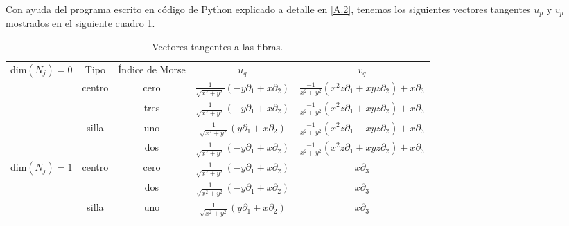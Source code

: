 \documentclass[a4paper,10pt]{book}
\begin{document}
Con ayuda del programa escrito en c\'odigo de Python explicado a detalle en \ref{A.2}, tenemos los siguientes vectores tangentes $u_{p}$ y $v_{p}$ mostrados en el siguiente cuadro \ref{tabla7}.\\

\begin{table}[!ht]
\centering
\begin{tabular}{|c|c|c|c|c|}
\hline
\multirow{5}{*}{dim$(N_{j})=0$} & Tipo                    & \multicolumn{1}{l|}{\'Indice de Morse } & $u_{q}$                                                                      & $v_{q}$                                                                                                      \\ \cline{2-5} 
                                & \multirow{2}{*}{centro} & cero                             & $\frac{1}{\sqrt{x^{2}+y^{2}}}(-y\partial_{1}+x\partial_{2})$ & $\frac{-1}{x^{2}+y^{2}}(x^{2}z\partial_{1}+xyz\partial_{2})+x\partial_{3}$ \\ \cline{3-5} 
                                &                         & tres                            & $\frac{1}{\sqrt{x^{2}+y^{2}}}(-y\partial_{1}+x\partial_{2})$ & $\frac{-1}{x^{2}+y^{2}}(x^{2}z\partial_{1}+xyz\partial_{2})+x\partial_{3}$ \\ \cline{2-5} 
                                & \multirow{2}{*}{silla} & uno                              & $\frac{1}{\sqrt{x^{2}+y^{2}}}(y\partial_{1}+x\partial_{2})$  & $\frac{-1}{x^{2}+y^{2}}(x^{2}z\partial_{1}-xyz\partial_{2})+x\partial_{3}$ \\ \cline{3-5} 
                                &                         & dos                              & $\frac{1}{\sqrt{x^{2}+y^{2}}}(-y\partial_{1}+x\partial_{2})$ & $\frac{-1}{x^{2}+y^{2}}(x^{2}z\partial_{1}+xyz\partial_{2})+x\partial_{3}$ \\ \hline
\multirow{3}{*}{dim$(N_{j})=1$} & \multirow{2}{*}{centro} & cero                             & $\frac{1}{\sqrt{x^{2}+y^{2}}}(-y\partial_{1}+x\partial_{2})$ & $x\partial_{3}$                                                                                         \\ \cline{3-5} 
                                &                         & dos                              & $\frac{1}{\sqrt{x^{2}+y^{2}}}(-y\partial_{1}+x\partial_{2})$ & $x\partial_{3}$                                                                                         \\ \cline{2-5} 
                                & silla                  & uno                              & $\frac{1}{\sqrt{x^{2}+y^{2}}}(y\partial_{1}+x\partial_{2})$  & $x\partial_{3}$                                                                                         \\ \hline
\end{tabular}
\caption{Vectores tangentes a las fibras.}
\label{tabla7}
\end{table}
\end{document}
